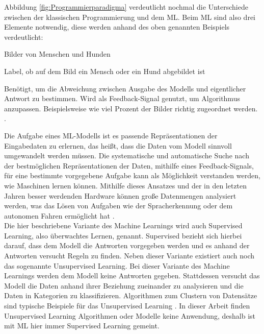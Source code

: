 Abbildung \ref*{fig:Programmierparadigma} verdeutlicht nochmal die Unterschiede zwischen der klassischen Programmierung und dem \ac{ML}. Beim \ac{ML} sind also drei Elemente
notwendig, diese werden anhand des oben genannten Beispiels verdeutlicht: 

\begin{description}[style=multiline,leftmargin=3cm,font=\bfseries]
    \item[Eingabedaten] Bilder von Menschen und Hunden \cite[S.24]{DL_PY}
    \item[Antworten] Label, ob auf dem Bild ein Mensch oder ein Hund abgebildet ist \cite[S.24]{DL_PY}
    \item[Metrik zur Bewertung des Algorithmus] Benötigt, um die Abweichung zwischen Ausgabe des Modells und eigentlicher Antwort zu bestimmen. Wird als Feedback-Signal genutzt,
    um Algorithmus anzupassen. Beispielsweise wie viel Prozent der Bilder richtig zugeordnet werden. \cite[S.24f.]{DL_PY}.  
\end{description}

Die Aufgabe eines \ac{ML}-Modells ist es passende Repräsentationen der Eingabedaten zu erlernen, das heißt, dass die Daten vom Modell sinnvoll umgewandelt werden müssen. 
Die systematische und automatische Suche nach der bestmöglichen Repräsentationen der Daten, mithilfe eines Feedback-Signals, für eine bestimmte vorgegebene Aufgabe kann als Möglichkeit 
verstanden werden, wie Maschinen lernen können. Mithilfe dieses Ansatzes und der in den letzten Jahren besser werdenden Hardware können große Datenmengen analysiert werden, was das Lösen von 
Aufgaben wie der Spracherkennung oder dem autonomen Fahren ermöglicht hat \cite[vgl. S.24ff.]{DL_PY}.\\

Die hier beschriebene Variante des Machine Learnings wird auch Supervised Learning, also überwachtes Lernen, genannt. \glqq Supervised\grqq{} bezieht sich hierbei darauf, dass
dem Modell die Antworten vorgegeben werden und es anhand der Antworten versucht Regeln zu finden. Neben dieser Variante existiert auch noch das sogenannte
Unsupervised Learning. Bei dieser Variante des Machine Learnings werden dem Modell keine Antworten gegeben. Stattdessen versucht das Modell die Daten anhand ihrer
Beziehung zueinander zu analysieren und die Daten in Kategorien zu klassifizieren. Algorithmen zum Clustern von Datensätze sind typische Beispiele für das Unsupervised Learning
\cite[vgl. S.47ff.]{AI_Huawei}. In dieser Arbeit finden Unsupervised Learning Algorithmen oder Modelle keine Anwendung, deshalb ist mit \ac{ML} hier immer Supervised Learning gemeint.

